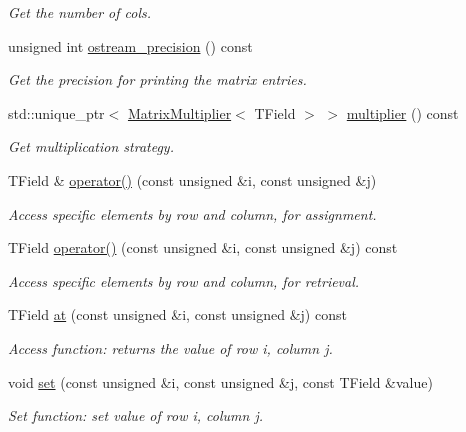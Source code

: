 \begin{DoxyCompactItemize}
\begin{DoxyCompactList}\small\item\em Get the number of cols. \end{DoxyCompactList}\item 
unsigned int \mbox{\hyperlink{classMatrix_aa93bff81f970ace86444f3f10125f4e2}{ostream\+\_\+precision}} () const
\begin{DoxyCompactList}\small\item\em Get the precision for printing the matrix entries. \end{DoxyCompactList}\item 
std\+::unique\+\_\+ptr$<$ \mbox{\hyperlink{classMatrixMultiplier}{Matrix\+Multiplier}}$<$ T\+Field $>$ $>$ \mbox{\hyperlink{classMatrix_a8b97189db83694ee636a3a5102eef151}{multiplier}} () const
\begin{DoxyCompactList}\small\item\em Get multiplication strategy. \end{DoxyCompactList}\item 
T\+Field \& \mbox{\hyperlink{classMatrix_a9152e170e400598d3ced52e7b70e2d8b}{operator()}} (const unsigned \&i, const unsigned \&j)
\begin{DoxyCompactList}\small\item\em Access specific elements by row and column, for assignment. \end{DoxyCompactList}\item 
T\+Field \mbox{\hyperlink{classMatrix_a4d5a4a14c020275796dfa8c918badd7d}{operator()}} (const unsigned \&i, const unsigned \&j) const
\begin{DoxyCompactList}\small\item\em Access specific elements by row and column, for retrieval. \end{DoxyCompactList}\item 
T\+Field \mbox{\hyperlink{classMatrix_acafe521165ef5c2204fb621a52feecc6}{at}} (const unsigned \&i, const unsigned \&j) const
\begin{DoxyCompactList}\small\item\em Access function\+: returns the value of row i, column j. \end{DoxyCompactList}\item 
void \mbox{\hyperlink{classMatrix_ad76d9febbbb81d828c9a534858b04283}{set}} (const unsigned \&i, const unsigned \&j, const T\+Field \&value)
\begin{DoxyCompactList}\small\item\em Set function\+: set value of row i, column j. \end{DoxyCompactList}\item 

\end{DoxyCompactItemize}
